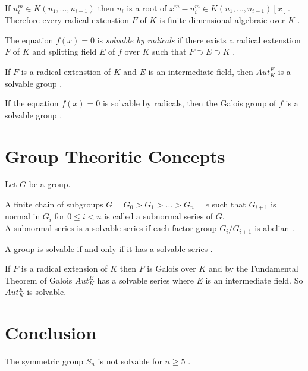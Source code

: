 \begin{remark}
If \(u_i^m \in K(u_1,...,u_{i-1})\) then \(u_i\) is a root of \(x^m-u_i^m \in K(u_1,...,u_{i-1})[x]\). \\
Therefore every radical extenstion \(F\) of \(K\) is finite dimensional algebraic over \(K\) \cite{hunger}.
\end{remark}

\begin{definition}
The equation \(f(x)=0\) is \textit{solvable by radicals} if there exists a radical extenstion \(F\) of \(K\) and splitting field \(E\) of \(f\) over \(K\) such that \(F \supset E \supset K\) \cite{hunger}.
\end{definition}

\begin{theorem}
If \(F\) is a radical extenstion of \(K\) and \(E\) is an intermediate field, then \(Aut_K^E\) is a solvable group \cite{hunger}.
\end{theorem}

\begin{corollary}
If the equation \(f(x)=0\) is solvable by radicals, then the Galois group of \(f\) is a solvable group \cite{hunger}.
\end{corollary}

\section{Group Theoritic Concepts}
Let \(G\) be a group.

\begin{definition}
A finite chain of subgroups \(G=G_0>G_1>...>G_n={e}\) such that \(G_{i+1}\) is normal in \(G_i\) for \(0 \leq i < n\) is called a subnormal series of \(G\).\\
A subnormal series is a solvable series if each factor group \(G_i/G_{i+1}\) is abelian \cite{hunger}.
\end{definition}

\begin{definition}
A group is solvable if and only if it has a solvable series \cite{hunger}.
\end{definition}

If \(F\) is a radical extension of \(K\) then \(F\) is Galois over \(K\) and by the Fundamental Theorem of Galois \(Aut_K^E\) has a solvable series where \(E\) is an intermediate field. So \(Aut_K^E\) is solvable.

\section{Conclusion}
\begin{theorem}
The symmetric group \(S_n\) is not solvable for \(n \geq 5\) \cite{hunger}.
\end{theorem}

